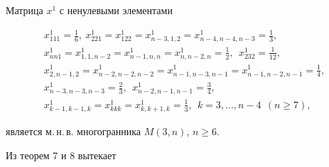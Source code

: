 \begin{thm}


Матрица $x^1$ с ненулевыми элементами


\begin{gather*}


x^1_{111}=\frac{1}{6},\ x^1_{221}=x^1_{122}=


x^1_{n-3,1,2}=x^1_{n-4,n-4,n-3}=\frac{1}{3},\\


%


x^1_{nn1}=x^1_{1,1,n-2}=x^1_{n-1,n,n}=x^1_{n,n-2,n}=


\frac{1}{2},\ \ x^1_{232}=\frac{1}{12},\\


%


x^1_{2,n-1,2}=x^1_{n-2,n-2,n-2}=x^1_{n-1,n-3,n-1}=


x^1_{n-1,n-2,n-1}=\frac{1}{4},\\


%


x^1_{n-3,n-3,n-3}=\frac{2}{3},\ \ x^1_{n-2,n-1,n-1}=\frac{3}{4},\\ 


%


x^1_{k-1,k-1,k}=x^1_{kkk}=x^1_{k,k+1,k}=


\frac{1}{3},\ \ k=3,\dotsc,n-4\ \ (n\geq 7),


\end{gather*}


является м.\,н.\,в. многогранника $M(3,n)$, $n\geq 6$.


\end{thm}





Из теорем 7 и 8 вытекает





